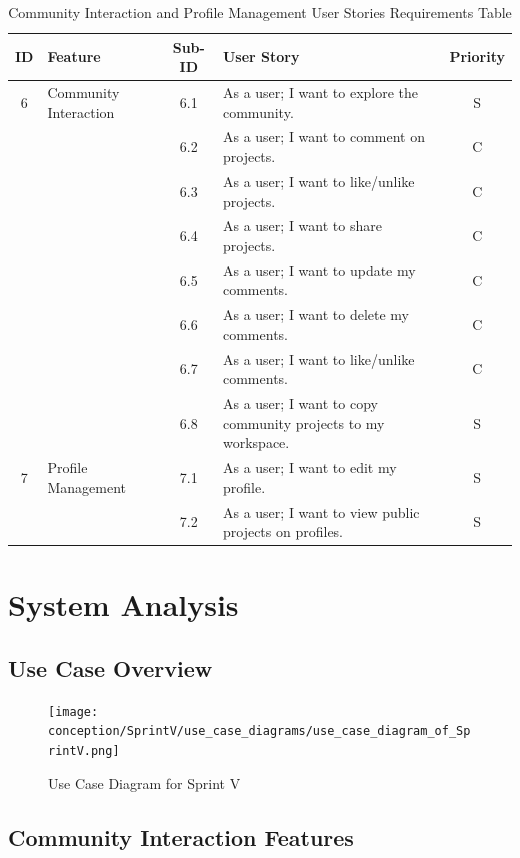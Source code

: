 \begin{table}[h]
    \centering
    \begin{tabular}{|c|l|c|p{8cm}|c|}
    \hline
    \textbf{ID} & \textbf{Feature} & \textbf{Sub-ID} & \textbf{User Story} & \textbf{Priority} \\
    \hline
    6 & Community Interaction & 6.1 & As a user; I want to explore the community. & S \\
    \hline
      &  & 6.2 & As a user; I want to comment on projects. & C \\
    \hline
      &  & 6.3 & As a user; I want to like/unlike projects. & C \\
    \hline
      &  & 6.4 & As a user; I want to share projects. & C \\
    \hline
      &  & 6.5 & As a user; I want to update my comments. & C \\
    \hline
      &  & 6.6 & As a user; I want to delete my comments. & C \\
    \hline
      &  & 6.7 & As a user; I want to like/unlike comments. & C \\
    \hline
      &  & 6.8 & As a user; I want to copy community projects to my workspace. & S \\
    \hline
    7 & Profile Management & 7.1 & As a user; I want to edit my profile. & S \\
    \hline
      &  & 7.2 & As a user; I want to view public projects on profiles. & S \\
    \hline
    \end{tabular}
    \caption{Community Interaction and Profile Management User Stories Requirements Table}
    \label{tab:community_profile}
    \end{table}
\section{System Analysis}

\subsection{Use Case Overview}

\begin{figure}[H]
\centering
\texttt{[image: conception/SprintV/use\_case\_diagrams/use\_case\_diagram\_of\_SprintV.png]}
\caption{Use Case Diagram for Sprint V}
\label{fig:use_case_sprint_v}
\end{figure}

\subsection{Community Interaction Features}

